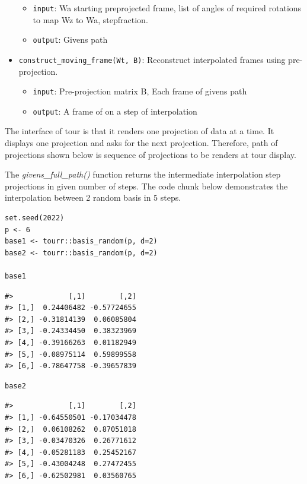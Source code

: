 \begin{itemize}
  \begin{itemize}
  \tightlist
  \item
    \texttt{input}: Wa starting preprojected frame, list of angles of required rotations to map Wz to Wa, stepfraction.
  \item
    \texttt{output}: Givens path
  \end{itemize}
\item
  \texttt{construct\_moving\_frame(Wt,\ B)}: Reconstruct interpolated frames using pre-projection.

  \begin{itemize}
  \tightlist
  \item
    \texttt{input}: Pre-projection matrix B, Each frame of givens path
  \item
    \texttt{output}: A frame of on a step of interpolation
  \end{itemize}
\end{itemize}

The interface of tour is that it renders one projection of data at a time. It displays one projection and asks for the next projection. Therefore, path of projections shown below is sequence of projections to be renders at tour display.

The \emph{givens\_full\_path()} function returns the intermediate interpolation step projections in given number of steps. The code chunk below demonstrates the interpolation between 2 random basis in 5 steps.

\begin{verbatim}
set.seed(2022)
p <- 6
base1 <- tourr::basis_random(p, d=2)
base2 <- tourr::basis_random(p, d=2)

base1
\end{verbatim}

\begin{verbatim}
#>             [,1]        [,2]
#> [1,]  0.24406482 -0.57724655
#> [2,] -0.31814139  0.06085804
#> [3,] -0.24334450  0.38323969
#> [4,] -0.39166263  0.01182949
#> [5,] -0.08975114  0.59899558
#> [6,] -0.78647758 -0.39657839
\end{verbatim}

\begin{verbatim}
base2
\end{verbatim}

\begin{verbatim}
#>             [,1]        [,2]
#> [1,] -0.64550501 -0.17034478
#> [2,]  0.06108262  0.87051018
#> [3,] -0.03470326  0.26771612
#> [4,] -0.05281183  0.25452167
#> [5,] -0.43004248  0.27472455
#> [6,] -0.62502981  0.03560765
\end{verbatim}


